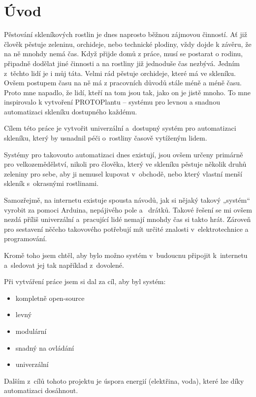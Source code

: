 \chapter*{Úvod}
Pěstování skleníkových rostlin je dnes naprosto běžnou zájmovou činností. 
Ať již člověk pěstuje zeleninu, orchideje, nebo technické plodiny, vždy dojde k závěru, že na ně mnohdy nemá čas.
Když přijde domů z práce, musí se postarat o rodinu, připadně dodělat jiné činnosti a na rostliny již jednoduše čas nezbývá.
Jedním z~těchto lidí je i můj táta.
Velmi rád pěstuje orchideje, které má ve skleníku.
Ovšem postupem času na ně má z pracovních důvodů stále méně a méně času.
Proto mne napadlo, že lidí, kteří na tom jsou tak, jako on je jistě mnoho.
To mne inspirovalo k vytvoření PROTOPlantu -- systému pro levnou a snadnou automatizaci skleníku dostupného každému. 

Cílem této práce je vytvořit univerzální a~dostupný systém pro automatizaci skleníku, který by usnadnil péči o~rostliny časově vytíženým lidem. 

Systémy pro takovouto automatizaci dnes existují, jsou ovšem určeny primárně pro velkozemědělství, nikoli pro člověka, který ve skleníku pěstuje několik druhů zeleniny pro sebe, aby ji nemusel kupovat v~obchodě, nebo který vlastní menší skleník s~okrasnými rostlinami. 

Samozřejmě, na internetu existuje spousta návodů, jak si nějaký takový „systém“ vyrobit za pomoci Arduina, nepájivého pole a~ drátků.
Takové řešení se mi ovšem nezdá příliš univerzální a~pracující lidé nemají mnohdy čas si takto hrát.
Zároveň pro sestavení něčeho takovového potřebují mít určité znalosti v~elektrotechnice a programování.

Kromě toho jsem chtěl, aby bylo možno systém v~budoucnu připojit k~internetu a~sledovat jej tak například z~dovolené.
\newline

Při vytváření práce jsem si dal za cíl, aby byl systém:
\begin{itemize}
    \item kompletně open-source
    \item levný
    \item modulární
    \item snadný na ovládání
    \item univerzální
\end{itemize}

Dalším z~cílů tohoto projektu je úspora energií (elektřina, voda), které lze díky automatizaci dosáhnout.

\newpage

